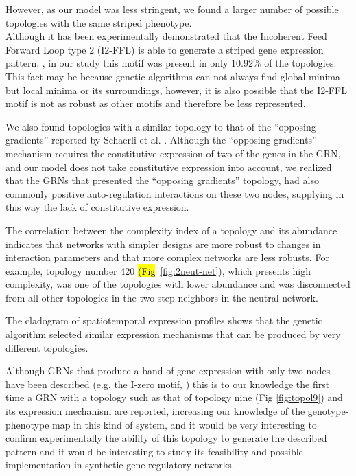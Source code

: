 \documentclass[10pt,letterpaper]{article}
\newcommand{\hil}[1]{\hl{#1}} %
\begin{document}
However, as our model was less stringent, we found a larger number of possible
topologies with the same striped phenotype.\\

Although it has been experimentally demonstrated that the Incoherent Feed
Forward Loop type 2 (I2-FFL) is able to generate a striped gene expression
pattern, \cite{Schaerli2014, Basu2005}, in our study this motif was present in
only 10.92\% of the topologies. This fact may be because genetic algorithms
can not always find global minima but local minima or its surroundings, however,
it is also possible that the I2-FFL motif is not as robust as other motifs and
therefore be less represented.

We also found topologies with a similar topology to that of the “opposing
gradients” reported by Schaerli et al. \cite{Schaerli2018,Schaerli2014}.
Although the “opposing gradients” mechanism requires the constitutive expression
of two of the genes in the GRN, and our model does not take constitutive
expression into account, we realized that the GRNs that presented the “opposing
gradients” topology, had also commonly positive auto-regulation interactions on
these two nodes, supplying in this way the lack of constitutive expression.

The correlation between the complexity index of a topology and its abundance
indicates that networks with simpler designs are more robust to changes in
interaction parameters and that more complex networks are less robusts. For
example, topology number 420 \hil{(Fig}~\ref{fig:2neut-net}), which
presents high complexity, was one of the
topologies with lower abundance and was disconnected from all other topologies
in the two-step neighbors in the neutral network.

The cladogram of spatiotemporal expression profiles shows that the genetic
algorithm selected similar expression mechanisms that can be produced by very
different topologies.

Although GRNs that produce a band of gene expression with only two nodes have
been described (e.g. the I-zero motif, \cite{Schaerli2014}) this is to our
knowledge the first time a GRN with a topology such as that of topology nine
(Fig \ref{fig:topol9})
and its expression mechanism are reported, increasing our knowledge of the
genotype-phenotype map in this kind of system, and it would be very interesting
to confirm experimentally the ability of this topology to generate the described
pattern and it would be interesting to study its feasibility and possible
implementation in synthetic gene regulatory networks.
\end{document}
